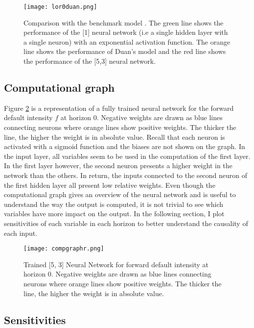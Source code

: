 \begin{figure}
    \centering
    \texttt{[image: lor0duan.png]}
    \caption{Comparison with the benchmark model \citet{Duan2012}. The green line shows the performance of the [1] neural network (i.e a single hidden layer with a single neuron) with an exponential activation function. The orange line shows the performance of Duan's model and the red line shows the performance of the [5,3] neural network.}
    \label{fig:lor0duan}
\end{figure}

\subsection{Computational graph}
\label{sec4-3}

Figure \ref{fig:compgraph} is a representation of a fully trained neural network for the forward default intensity $f$ at horizon 0. Negative weights are drawn as blue lines connecting neurons where orange lines show positive weights. The thicker the line, the higher the weight is in absolute value. Recall that each neuron is activated with a sigmoid function and the biases are not shown on the graph.
In the input layer, all variables seem to be used in the computation of the first layer. In the first layer however, the second neuron presents a higher weight in the network than the others. In return, the inputs connected to the second neuron of the first hidden layer all present low relative weights. Even though the computational graph gives an overview of the neural network and is useful to understand the way the output is computed, it is not trivial to see which variables have more impact on the output. In the following section, I plot sensitivities of each variable in each horizon to better understand the causality of each input.

\begin{figure}[H]
    \centering
    \texttt{[image: compgraphr.png]}
    \caption{Trained [5, 3] Neural Network for forward default intensity at horizon 0. Negative weights are drawn as blue lines connecting neurons where orange lines show positive weights. The thicker the line, the higher the weight is in absolute value.}
    \label{fig:compgraph}
\end{figure}

\subsection{Sensitivities}
\label{sec4-4}

